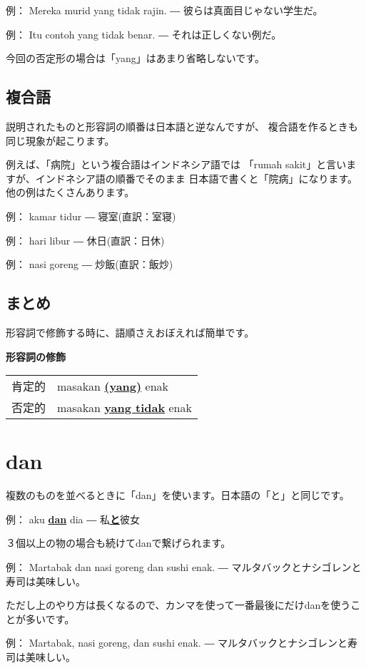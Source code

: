 \documentclass[uplatex]{jsarticle}
\theoremstyle{definition}
\newcommand{\example}[2]{
例： #1 ― #2
}
\newcommand{\bu}[1]{\underline{\textbf{#1}}}
\newcommand{\bi}[1]{\bu{#1}}
\newcommand{\bj}[1]{\bu{#1}}
\begin{document}
\example{Mereka murid yang tidak rajin.}{彼らは真面目じゃない学生だ。}

\example{Itu contoh yang tidak benar.}{それは正しくない例だ。}

今回の否定形の場合は「yang」はあまり省略しないです。

\subsection*{複合語}

説明されたものと形容詞の順番は日本語と逆なんですが、
複合語を作るときも同じ現象が起こります。

例えば、「病院」という複合語はインドネシア語では
「rumah sakit」と言いますが、インドネシア語の順番でそのまま
日本語で書くと「院病」になります。他の例はたくさんあります。

\example{kamar tidur}{寝室(直訳：室寝)}

\example{hari libur}{休日(直訳：日休)}

\example{nasi goreng}{炒飯(直訳：飯炒)}

\subsection*{まとめ}

形容詞で修飾する時に、語順さえおぼえれば簡単です。

\textbf{形容詞の修飾}

\begin{tabular}{ll}
肯定的 & masakan \bi{(yang)} enak \\
否定的 & masakan \bi{yang tidak} enak
\end{tabular}

\section{dan}

複数のものを並べるときに「dan」を使います。日本語の「と」と同じです。

\example{aku \bi{dan} dia}{私\bj{と}彼女}

３個以上の物の場合も続けてdanで繋げられます。

\example{Martabak dan nasi goreng dan sushi enak.}{マルタバックとナシゴレンと寿司は美味しい。}

ただし上のやり方は長くなるので、カンマを使って一番最後にだけdanを使うことが多いです。

\example{Martabak, nasi goreng, dan sushi enak.}{マルタバックとナシゴレンと寿司は美味しい。}
\end{document}
